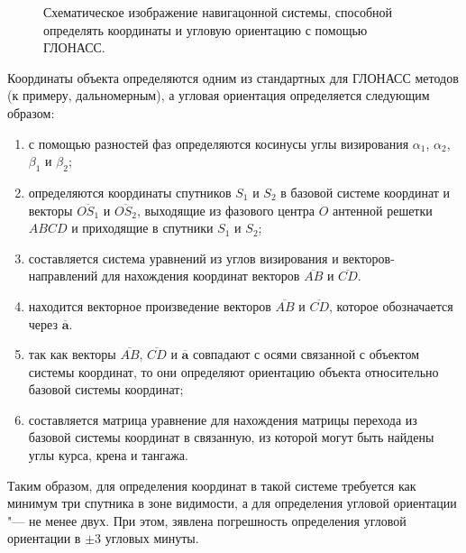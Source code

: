 \documentclass[../main.tex]{subfiles}
\begin{document}
\begin{figure}[tb]
    \begin{center}


    \caption{Схематическое изображение навигацонной системы, способной определять координаты и угловую ориентацию с помощью ГЛОНАСС.}
    \label{fig:glonass:pic2}
    \end{center}
\end{figure}

Координаты объекта определяются одним из стандартных для ГЛОНАСС методов (к примеру, дальномерным), а угловая ориентация определяется следующим образом:
\begin{enumerate}
    \item с помощью разностей фаз определяются косинусы углы визирования $\alpha_1$, $\alpha_2$, $\beta_1$ и $\beta_2$;
    \item определяются координаты спутников $S_1$ и $S_2$ в базовой системе координат и векторы $\overline{OS_1}$ и $\overline{OS_2}$, выходящие из фазового центра $O$ антенной решетки $ABCD$ и приходящие в спутники $S_1$ и $S_2$;
    \item составляется система уравнений из углов визирования и векторов-направлений для нахождения координат векторов $\overline{AB}$ и $\overline{CD}$.
    \item находится векторное произведение векторов $\overline{AB}$ и $\overline{CD}$, которое обозначается через $\overline{\mathbf{a}}$.
    \item так как векторы  $\overline{AB}$, $\overline{CD}$ и $\overline{\mathbf{a}}$ совпадают с осями связанной с объектом системы координат, то они определяют ориентацию объекта относительно базовой системы координат;
    \item составляется матрица уравнение для нахождения матрицы перехода из базовой системы координат в связанную, из которой могут быть найдены углы курса, крена и тангажа.
\end{enumerate}
Таким образом, для определения координат в такой системе требуется как минимум три спутника в зоне видимости, а для определения угловой ориентации "--- не менее двух. При этом, зявлена погрешность определения угловой ориентации в $\pm 3$ угловых минуты.
\end{document}
